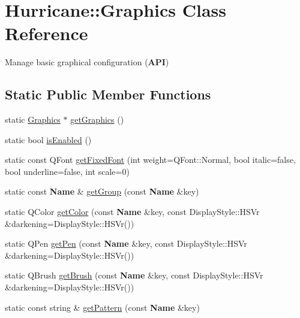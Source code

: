 \hypertarget{classHurricane_1_1Graphics}{}\section{Hurricane\+:\+:Graphics Class Reference}
\label{classHurricane_1_1Graphics}


Manage basic graphical configuration ({\bfseries A\+PI})  


\subsection*{Static Public Member Functions}
\begin{DoxyCompactItemize}
\item 
static \mbox{\hyperlink{classHurricane_1_1Graphics}{Graphics}} $\ast$ \mbox{\hyperlink{classHurricane_1_1Graphics_a4f8d6eaeef8d9ae781be929e95545f0c}{get\+Graphics}} ()
\item 
static bool \mbox{\hyperlink{classHurricane_1_1Graphics_a02964067103bdd4c27bbf4af91a47cf8}{is\+Enabled}} ()
\item 
static const Q\+Font \mbox{\hyperlink{classHurricane_1_1Graphics_a30322de9fd4a042d8773465c622a1650}{get\+Fixed\+Font}} (int weight=Q\+Font\+::\+Normal, bool italic=false, bool underline=false, int scale=0)
\item 
static const \textbf{ Name} \& \mbox{\hyperlink{classHurricane_1_1Graphics_a1262f31f53c2c36440e1e05fd2da17fc}{get\+Group}} (const \textbf{ Name} \&key)
\item 
static Q\+Color \mbox{\hyperlink{classHurricane_1_1Graphics_abaa552c464f1a664dc77cc0c0118c35c}{get\+Color}} (const \textbf{ Name} \&key, const Display\+Style\+::\+H\+S\+Vr \&darkening=Display\+Style\+::\+H\+S\+Vr())
\item 
static Q\+Pen \mbox{\hyperlink{classHurricane_1_1Graphics_a0197c915f8d76c3798cf19ea2d878834}{get\+Pen}} (const \textbf{ Name} \&key, const Display\+Style\+::\+H\+S\+Vr \&darkening=Display\+Style\+::\+H\+S\+Vr())
\item 
static Q\+Brush \mbox{\hyperlink{classHurricane_1_1Graphics_ad67a43df460d5c5d5179a81d2a72c9a9}{get\+Brush}} (const \textbf{ Name} \&key, const Display\+Style\+::\+H\+S\+Vr \&darkening=Display\+Style\+::\+H\+S\+Vr())
\item 
static const string \& \mbox{\hyperlink{classHurricane_1_1Graphics_a08111e942b095327fa6031dca7c96e8e}{get\+Pattern}} (const \textbf{ Name} \&key)
\item 

\end{DoxyCompactItemize}

